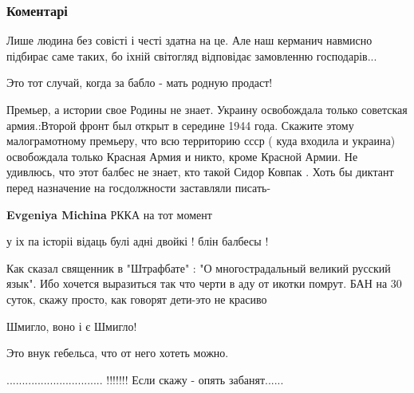  
 
 
 
 
\subsubsection{Коментарі}
\label{sec:28_10_2021.fb.dudkin_jurij.1.shmygal_vranje_osvobozhdenie_ukrainy.cmt}

\begin{itemize} %

Лише людина без совісті і честі здатна на це. Але наш керманич навмисно
підбирає саме таких, бо іхній світогляд відповідає замовленню господарів...

Это тот случай, когда за бабло - мать родную продаст!


Премьер, а истории свое Родины не знает. Украину освобождала только советская
армия.:Второй фронт был открыт в середине 1944 года. Скажите этому
малограмотному премьеру, что всю территорию ссср ( куда входила и украина)
освобождала только Красная Армия и никто, кроме Красной Армии. Не удивлюсь, что
этот балбес не знает, кто такой Сидор Ковпак . Хоть бы диктант перед назначение
на госдолжности заставляли писать-

\begin{itemize} %
\textbf{Evgeniya Michina} РККА на тот момент
\end{itemize} %

у іх па історіі відаць булі адні двойкі ! блін балбесы !


Как сказал священник в "Штрафбате" : "О многострадальный великий русский язык".
Ибо хочется выразиться так что черти в аду от икотки помрут. БАН на 30 суток,
скажу просто, как говорят дети-это не красиво


Шмигло, воно і є Шмигло!

Это внук гебельса, что от него хотеть можно.

............................... !!!!!!! Если скажу - опять забанят......

\end{itemize} %
